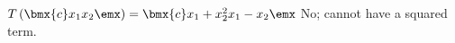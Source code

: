 {$T\left(\bmx{c}x_1\\x_2\emx\right) = \bmx{c}x_1+x_2^2\\x_1-x_2\emx$}
{No; cannot have a squared term.}